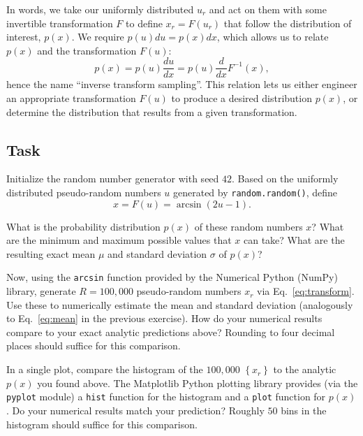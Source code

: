 \documentclass[12 pt]{article} %
\newcommand{\si}{\ensuremath{\sigma} }
\newcommand{\eq}[1]{Eq.~\ref{#1}}
\newcommand{\showmarks}[1]{\rightline{\texttt{[#1 marks]}}} %
\begin{document}
In words, we take our uniformly distributed $u_r$ and act on them with some invertible transformation $F$ to define $x_r = F(u_r)$ that follow the distribution of interest, $p(x)$.
We require $p(u) du = p(x) dx$, which allows us to relate $p(x)$ and the transformation $F(u)$:
\begin{equation*}
  p(x) = p(u) \frac{du}{dx} = p(u) \frac{d}{dx} F^{-1}(x),
\end{equation*}
hence the name ``inverse transform sampling''.
This relation lets us either engineer an appropriate transformation $F(u)$ to produce a desired distribution $p(x)$, or determine the distribution that results from a given transformation.

\subsection*{Task}
Initialize the random number generator with seed $42$.
Based on the uniformly distributed pseudo-random numbers $u$ generated by \texttt{random.random()}, define
\begin{equation}
  \label{eq:transform}
  x = F(u) = \arcsin\left(2u - 1\right).
\end{equation}

What is the probability distribution $p(x)$ of these random numbers $x$?
What are the minimum and maximum possible values that $x$ can take?
What are the resulting exact mean $\mu$ and standard deviation \si of $p(x)$?

\showmarks{6}

Now, using the \texttt{arcsin} function provided by the Numerical Python (NumPy) library, generate $R = 100{,}000$ pseudo-random numbers $x_r$ via \eq{eq:transform}.
Use these to numerically estimate the mean and standard deviation (analogously to \eq{eq:mean} in the previous exercise).
How do your numerical results compare to your exact analytic predictions above?
Rounding to four decimal places should suffice for this comparison.

\showmarks{6}

In a single plot, compare the histogram of the $100{,}000$ $\left\{x_r\right\}$ to the analytic $p(x)$ you found above.
The Matplotlib Python plotting library provides (via the \texttt{pyplot} module) a \texttt{hist} function for the histogram and a \texttt{plot} function for $p(x)$.
Do your numerical results match your prediction?
Roughly $50$ bins in the histogram should suffice for this comparison.

\showmarks{6}
\end{document}
